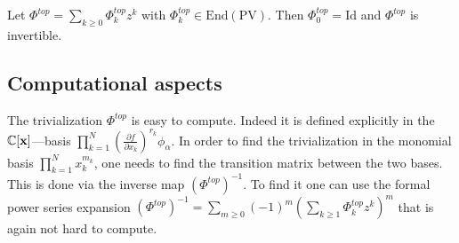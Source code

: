 \documentclass[12pt,a4paper]{amsart}
\newcommand{\CC}{{\mathbb{C}}}
\newcommand{\Jac}{\mathrm{Jac}}
\newcommand{\bx}{{\bf x}}
\def\H{{\mathcal H}}
\newcommand{\p}{{\partial}}
\newcommand{\<}{\left<}
\renewcommand{\>}{\right>}
\newcommand{\PV}{{\mathrm{PV}}}
\newcommand{\End}{{\mathrm{End}}}
\newtheorem{proposition}[theorem]{Proposition}
\numberwithin{equation}{section}
\begin{document}
Let $\Phi^{top} = \sum_{k \ge 0} \Phi^{top}_k z^k$ with $\Phi^{top}_k \in \mathrm{End}(\PV)$. Then $\Phi^{top}_0 = \mathrm{Id}$ and $\Phi^{top}$ is invertible.
%
%
%
%

\subsection{Computational aspects}\label{section: computational aspects}
The trivialization $\Phi^{top}$ is easy to compute. Indeed it is defined explicitly in the $\CC[\bx]$---basis $\prod_{k=1}^N (\frac{\p f}{\p x_k})^{r_k} \phi_\alpha$. In order to find the trivialization in the monomial basis $\prod_{k=1}^N x_k^{m_k}$, one needs to find the transition matrix between the two bases.
This is done via the inverse map $(\Phi^{top})^{-1}$. To find it one can use the formal power series expansion $(\Phi^{top})^{-1} = \sum_{m \ge 0} (-1)^m \left(\sum_{k \ge 1}\Phi_k^{top} z^k \right)^m $ that is again not hard to compute.
\end{document}
